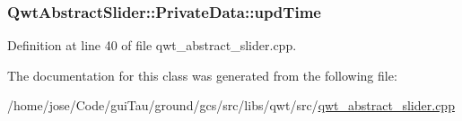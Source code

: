 \hypertarget{class_qwt_abstract_slider_1_1_private_data_a6c0f65380033052f9da6bbcecbe81a83}{
\subsubsection[{upd\-Time}]{ Qwt\-Abstract\-Slider\-::\-Private\-Data\-::upd\-Time}}\label{class_qwt_abstract_slider_1_1_private_data_a6c0f65380033052f9da6bbcecbe81a83}


Definition at line 40 of file qwt\-\_\-abstract\-\_\-slider.\-cpp.



The documentation for this class was generated from the following file\-:\begin{DoxyCompactItemize}
\item 
/home/jose/\-Code/gui\-Tau/ground/gcs/src/libs/qwt/src/\hyperlink{qwt__abstract__slider_8cpp}{qwt\-\_\-abstract\-\_\-slider.\-cpp}\end{DoxyCompactItemize}
